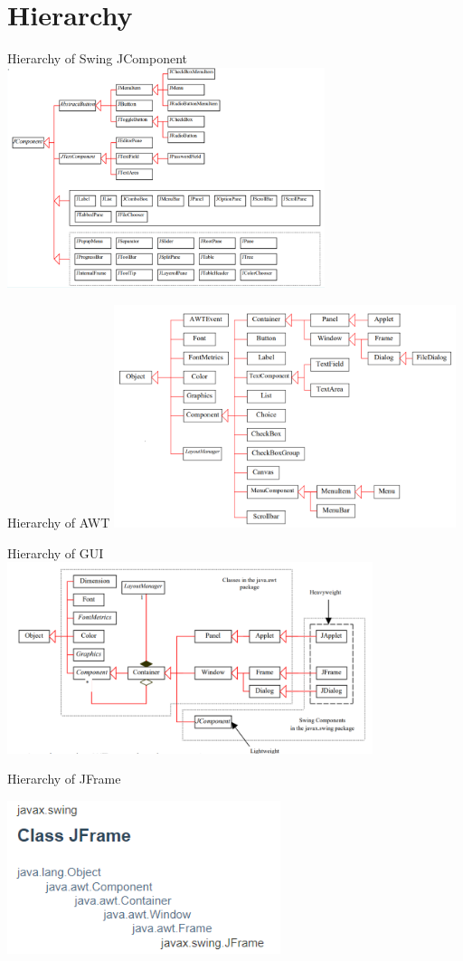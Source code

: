 \documentclass[11pt]{beamer}
\begin{document}
	\section{Hierarchy}
	\begin{frame}{Hierarchy of Swing JComponent}
		\includegraphics[width=9.3cm]{images/hier}
	\end{frame}
	\begin{frame}{Hierarchy of AWT}
		\includegraphics[width=10cm]{images/hierawt}
	\end{frame}
	\begin{frame}{Hierarchy of GUI}
		\includegraphics[width=10.7cm]{images/heig}
	\end{frame}
	\begin{frame}{Hierarchy of JFrame}
		\begin{center}
			\includegraphics[width=8cm]{images/jerar}
		\end{center}
	\end{frame}
\end{document}
